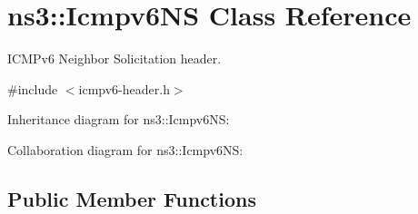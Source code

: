 \hypertarget{classns3_1_1Icmpv6NS}{}\section{ns3\+:\+:Icmpv6\+NS Class Reference}
\label{classns3_1_1Icmpv6NS}


I\+C\+M\+Pv6 Neighbor Solicitation header.  




{\ttfamily \#include $<$icmpv6-\/header.\+h$>$}



Inheritance diagram for ns3\+:\+:Icmpv6\+NS\+:


Collaboration diagram for ns3\+:\+:Icmpv6\+NS\+:
\subsection*{Public Member Functions}
